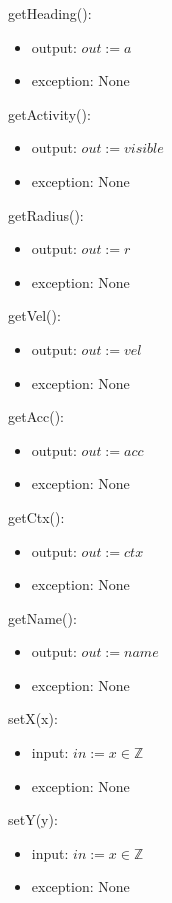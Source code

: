 \documentclass[12pt]{article}
\begin{document}
\noindent getHeading():
\begin{itemize}
    \item output: $out := a$
    \item exception: None
\end{itemize}

\noindent getActivity():
\begin{itemize}
    \item output: $out := visible$
    \item exception: None
\end{itemize}

\noindent getRadius():
\begin{itemize}
    \item output: $out := r$
    \item exception: None
\end{itemize}

\noindent getVel():
\begin{itemize}
    \item output: $out := vel$
    \item exception: None
\end{itemize}

\noindent getAcc():
\begin{itemize}
    \item output: $out := acc$
    \item exception: None
\end{itemize}

\noindent getCtx():
\begin{itemize}
    \item output: $out := ctx$
    \item exception: None
\end{itemize}

\noindent getName():
\begin{itemize}
    \item output: $out := name$
    \item exception: None
\end{itemize}

\noindent setX(x):
\begin{itemize}
    \item input: $in := x \in \mathbb{Z}$
    \item exception: None
\end{itemize}

\noindent setY(y):
\begin{itemize}
    \item input: $in := x \in \mathbb{Z}$
    \item exception: None
\end{itemize}
\end{document}
